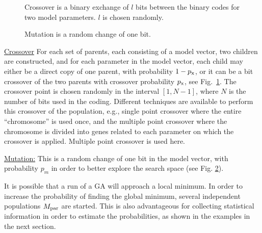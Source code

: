 \documentclass{saclantc}
\begin{document}
\begin{figure}
\epsfxsize=9cm
\centerline{}
\caption{Crossover is a binary exchange of $l$ bits 
between the binary codes for two
model parameters. $l$ is chosen randomly.}
\label{fig:cross}
\end{figure}
\begin{figure}
\epsfxsize=8cm
\centerline{}
\caption{Mutation is a random change of one bit.}
\label{fig:mut}
\end{figure}


\underline{Crossover}
 For each set of parents, each consisting of a model vector, two
 children are constructed, and for each parameter in the model vector,
 each child may either be a direct copy of one parent, with
 probability $1-p_{\rm x}$, or it can be a bit crossover of the two
 parents with crossover probability $p_{\rm x}$, 
 see Fig.\ \ref{fig:cross}.  The
 crossover point is chosen randomly in the interval $[ 1,N-1 ]$, where
 $N$ is the number of bits used in the coding. Different techniques
 are available to perform this crossover of the population, e.g.,
 single point crossover where the entire ``chromosome'' is used once, and
 the multiple point crossover where the chromosome is divided into
 genes related to each parameter on which the crossover is
 applied. Multiple point crossover is used here.

\underline{Mutation:} This is a random change of one bit in the model
vector, with probability $p_m$ in order to better explore the search
space (see Fig. \ref{fig:mut}).
\vspace{0.1in}

It is possible that a run of a GA will approach a local minimum. In
order to increase the probability of finding the global minimum,
several independent populations $ M_{\rm par}$ are started.  This is
also advantageous for collecting statistical information in order to estimate
the probabilities, as shown in the examples in the next section.
\end{document}
